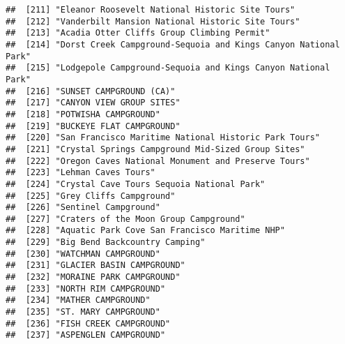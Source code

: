 \documentclass[
]{article}
\begin{document}
\begin{verbatim}
##  [211] "Eleanor Roosevelt National Historic Site Tours"                                      
##  [212] "Vanderbilt Mansion National Historic Site Tours"                                     
##  [213] "Acadia Otter Cliffs Group Climbing Permit"                                           
##  [214] "Dorst Creek Campground-Sequoia and Kings Canyon National Park"                       
##  [215] "Lodgepole Campground-Sequoia and Kings Canyon National Park"                         
##  [216] "SUNSET CAMPGROUND (CA)"                                                              
##  [217] "CANYON VIEW GROUP SITES"                                                             
##  [218] "POTWISHA CAMPGROUND"                                                                 
##  [219] "BUCKEYE FLAT CAMPGROUND"                                                             
##  [220] "San Francisco Maritime National Historic Park Tours"                                 
##  [221] "Crystal Springs Campground Mid-Sized Group Sites"                                    
##  [222] "Oregon Caves National Monument and Preserve Tours"                                   
##  [223] "Lehman Caves Tours"                                                                  
##  [224] "Crystal Cave Tours Sequoia National Park"                                            
##  [225] "Grey Cliffs Campground"                                                              
##  [226] "Sentinel Campground"                                                                 
##  [227] "Craters of the Moon Group Campground"                                                
##  [228] "Aquatic Park Cove San Francisco Maritime NHP"                                        
##  [229] "Big Bend Backcountry Camping"                                                        
##  [230] "WATCHMAN CAMPGROUND"                                                                 
##  [231] "GLACIER BASIN CAMPGROUND"                                                            
##  [232] "MORAINE PARK CAMPGROUND"                                                             
##  [233] "NORTH RIM CAMPGROUND"                                                                
##  [234] "MATHER CAMPGROUND"                                                                   
##  [235] "ST. MARY CAMPGROUND"                                                                 
##  [236] "FISH CREEK CAMPGROUND"                                                               
##  [237] "ASPENGLEN CAMPGROUND"                                                                

\end{verbatim}
\end{document}
